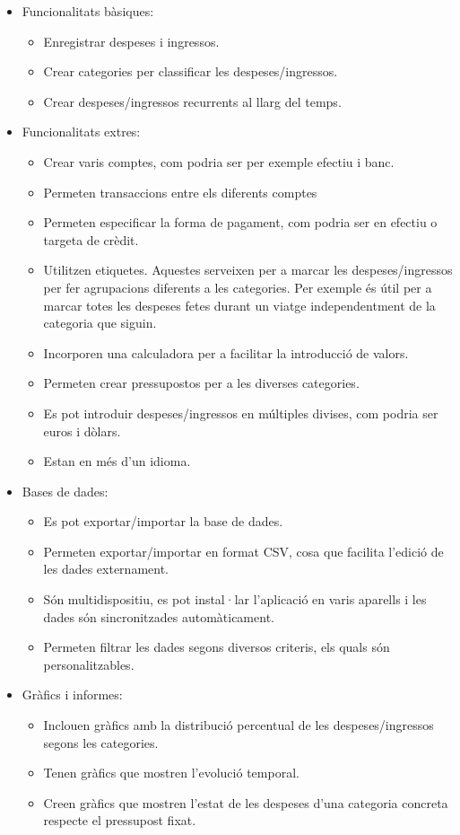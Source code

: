 \begin{itemize}
\item Funcionalitats bàsiques:
\begin{itemize}
\item Enregistrar despeses i ingressos.
\item Crear categories per classificar les despeses/ingressos.
\item Crear despeses/ingressos recurrents al llarg del temps.
\end{itemize}

\item Funcionalitats extres:
\begin{itemize}
\item Crear varis comptes, com podria ser per exemple efectiu i banc.
\item Permeten transaccions entre els diferents comptes
\item Permeten especificar la forma de pagament, com podria ser en efectiu o targeta de crèdit.
\item Utilitzen etiquetes. Aquestes serveixen per a marcar les despeses/ingressos per fer agrupacions diferents a les categories. Per exemple és útil per a marcar totes les despeses fetes durant un viatge independentment de la categoria que siguin. 
\item Incorporen una calculadora per a facilitar la introducció de valors.
\item Permeten crear pressupostos per a les diverses categories.
\item Es pot introduir despeses/ingressos en múltiples divises, com podria ser euros i dòlars.
\item Estan en més d'un idioma.
\end{itemize}

\item Bases de dades:
\begin{itemize}
\item Es pot exportar/importar la base de dades.
\item Permeten exportar/importar en format CSV, cosa que facilita l'edició de les dades externament.
\item Són multidispositiu, es pot instal·lar l'aplicació en varis aparells i les dades són sincronitzades automàticament.
\item Permeten filtrar les dades segons diversos criteris, els quals són personalitzables. 
\end{itemize}

\item Gràfics i informes:
\begin{itemize}
\item Inclouen gràfics amb la distribució percentual de les despeses/ingressos segons les categories.
\item Tenen gràfics que mostren l'evolució temporal.
\item Creen gràfics que mostren l'estat de les despeses d'una categoria concreta respecte el pressupost fixat.
\end{itemize}


\end{itemize}
